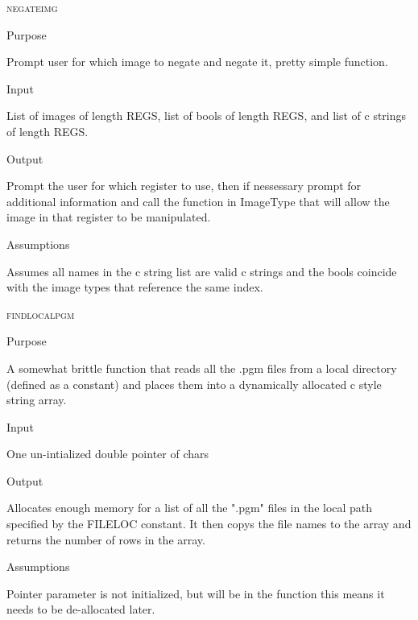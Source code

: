 \documentclass[pdftex, 11pt]{article}
\begin{document}
\begin{description}
	\item{\textsc{negateimg}}
		\begin{description}
			\item{Purpose}

				Prompt user for which image to negate and negate it, pretty simple function.

			\item{Input}

				List of images of length REGS, list of bools of length
				REGS, and list of c strings of length REGS.

			\item{Output}

				Prompt the user for which register to use, then if nessessary
				prompt for additional information and call the function
				in ImageType that will allow the image in that register to
				be manipulated.

			\item{Assumptions}

				Assumes all names in the c string list are valid c
				strings and the bools coincide with the image types that
				reference the same index.

		\end{description}



	\item{\textsc{findlocalpgm}}
		\begin{description}
			\item{Purpose}

				A somewhat brittle function that reads all the .pgm files from a local
				directory (defined as a constant) and places them into a dynamically
				allocated c style string array.

			\item{Input}

				One un-intialized double pointer of chars

			\item{Output}

				Allocates enough memory for a list of all the ".pgm" files
				in the local path specified by the FILELOC constant.  It
				then copys the file names to the array and returns the
				number of rows in the array.

			\item{Assumptions}

				Pointer parameter is not initialized, but will be in the function
				this means it needs to be de-allocated later.

		\end{description}


\end{description}
\end{document}
